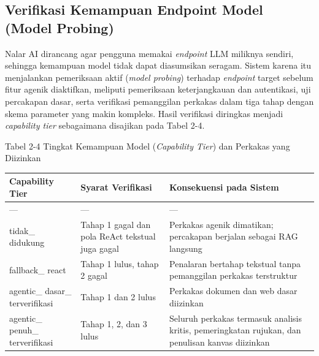 \documentclass[12pt,a4paper]{article}
\begin{document}
\subsection*{Verifikasi Kemampuan Endpoint Model (Model Probing)}

Nalar AI dirancang agar pengguna memakai \textit{endpoint} LLM miliknya sendiri, sehingga kemampuan model tidak dapat diasumsikan seragam. Sistem karena itu menjalankan pemeriksaan aktif (\textit{model probing}) terhadap \textit{endpoint} target sebelum fitur agenik diaktifkan, meliputi pemeriksaan keterjangkauan dan autentikasi, uji percakapan dasar, serta verifikasi pemanggilan perkakas dalam tiga tahap dengan skema parameter yang makin kompleks. Hasil verifikasi diringkas menjadi \textit{capability tier} sebagaimana disajikan pada Tabel 2-4.



Tabel 2-4	Tingkat Kemampuan Model (\textit{Capability Tier}) dan Perkakas yang Diizinkan



\begin{table}[h]

\centering

\begin{tabular}{lll}

\toprule

Capability Tier & Syarat Verifikasi & Konsekuensi pada Sistem \\

\midrule

--- & --- & --- \\

tidak\_ didukung & Tahap 1 gagal dan pola ReAct tekstual juga gagal & Perkakas agenik dimatikan; percakapan berjalan sebagai RAG langsung \\

fallback\_ react & Tahap 1 lulus, tahap 2 gagal & Penalaran bertahap tekstual tanpa pemanggilan perkakas terstruktur \\

agentic\_ dasar\_ terverifikasi & Tahap 1 dan 2 lulus & Perkakas dokumen dan web dasar diizinkan \\

agentic\_ penuh\_ terverifikasi & Tahap 1, 2, dan 3 lulus & Seluruh perkakas termasuk analisis kritis, pemeringkatan rujukan, dan penulisan kanvas diizinkan \\

\bottomrule

\end{tabular}

\end{table}
\end{document}
